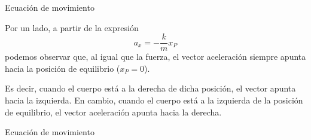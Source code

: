 \documentclass[11pt,handout,aspectratio=1610]{beamer}
\begin{document}
\begin{frame}{Ecuación de movimiento}

    Por un lado, a partir de la expresión $$a_x = - \frac{k}{m} x_P$$ podemos observar que, al igual que la fuerza, el vector aceleración siempre apunta hacia la posición de equilibrio ($x_P = 0$). 
    
    \vspace{11pt}
    
    Es decir, cuando el cuerpo está a la derecha de dicha posición, el vector apunta hacia la izquierda. En cambio, cuando el cuerpo está a la izquierda de la posición de equilibrio, el vector aceleración apunta hacia la derecha.

\end{frame}

\begin{frame}{Ecuación de movimiento}


\end{frame}
\end{document}
